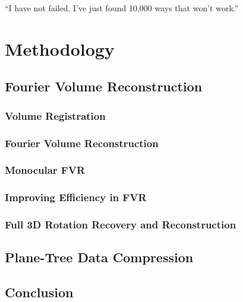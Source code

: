 \begin{savequote}[8cm]
  ``I have not failed. I've just found 10,000 ways that won't work.''
\end{savequote}
\makeatletter
\chapter{Methodology}


\section{Fourier Volume Reconstruction}
\label{FVRSectionA}


\subsection{Volume Registration}

\subsection{Fourier Volume Reconstruction}

\subsection{Monocular FVR}

\subsection{Improving Efficiency in FVR}

\subsection{Full 3D Rotation Recovery and Reconstruction}


\section{Plane-Tree Data Compression}



\section{Conclusion}